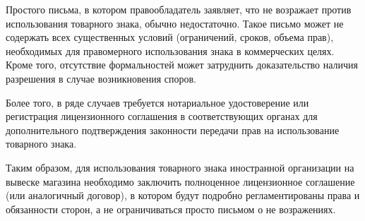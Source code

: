 \documentclass{bsuir}
\begin{document}
Простого письма, в котором правообладатель заявляет, что не возражает против
использования товарного знака, обычно недостаточно. Такое письмо может не
содержать всех существенных условий (ограничений, сроков, объема прав),
необходимых для правомерного использования знака в коммерческих целях. Кроме
того, отсутствие формальностей может затруднить доказательство наличия
разрешения в случае возникновения споров.

Более того, в ряде случаев требуется нотариальное удостоверение или регистрация
лицензионного соглашения в соответствующих органах для дополнительного
подтверждения законности передачи прав на использование товарного знака.

Таким образом, для использования товарного знака иностранной организации на
вывеске магазина необходимо заключить полноценное лицензионное соглашение (или
аналогичный договор), в котором будут подробно регламентированы права и
обязанности сторон, а не ограничиваться просто письмом о не возражениях.
\end{document}
